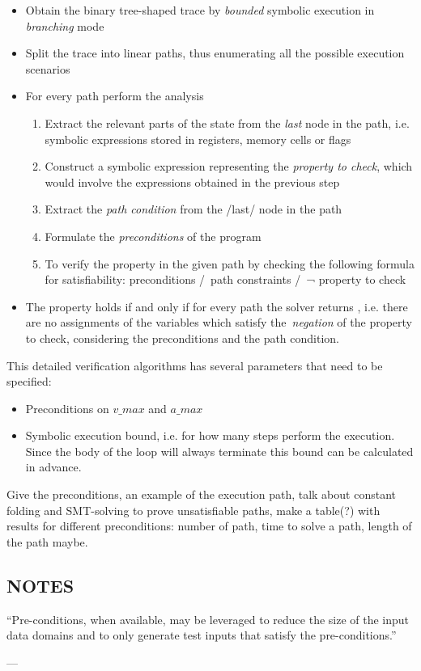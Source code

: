 \begin{itemize}
  \item Obtain the binary tree-shaped trace by \emph{bounded} symbolic execution
  in \emph{branching} mode
  \item Split the trace into linear paths, thus enumerating all the possible
    execution scenarios
  \item For every path perform the analysis
    \begin{enumerate}
      \item Extract the relevant parts of the state from the \emph{last} node in
            the path, i.e. symbolic expressions stored in
            registers, memory cells or flags
      \item Construct a symbolic expression representing the \emph{property to check},
            which would involve the expressions obtained in the previous step
      \item Extract the \emph{path condition} from the /last/ node in the path
      \item Formulate the \emph{preconditions} of the program
      \item To verify the property in the given path by checking the following
            formula for satisfiability:
              preconditions /\ path constraints /\ ¬ property to check
    \end{enumerate}
    \item  The property holds if and only if for every path the solver returns
           , i.e. there are no assignments of the variables which
           satisfy the~\emph{negation} of the property to check, considering the
           preconditions and the path condition.
\end{itemize}

This detailed verification algorithms has several parameters that need to be specified:

\begin{itemize}
\item Preconditions on $v\_max$ and $a\_max$
\item Symbolic execution bound, i.e. for how many steps perform the execution. Since the
      body of the loop will always terminate this bound can be calculated in advance.
\end{itemize}

Give the preconditions, an example of the execution path, talk about constant folding
and SMT-solving to prove unsatisfiable paths, make a table(?) with results for different
preconditions: number of path, time to solve a path, length of the path maybe.

\subsection{NOTES}

``Pre-conditions, when
available, may be leveraged to reduce the size of the input
data domains and to only generate test inputs that satisfy
the pre-conditions.''


---
